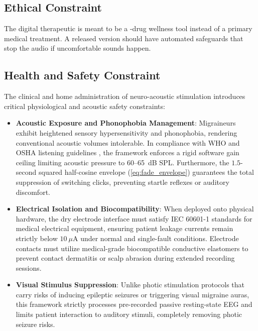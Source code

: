 \documentclass[12pt, a4paper]{report}
\begin{document}
    \subsection{Ethical Constraint}
    The digital therapeutic is meant to be a -drug wellness tool instead of a primary medical treatment. A released version should have automated safeguards that stop the audio if uncomfortable sounds happen.

    \subsection{Health and Safety Constraint}
    The clinical and home administration of neuro-acoustic stimulation introduces critical physiological and acoustic safety constraints:
    \begin{itemize}
        \item \textbf{Acoustic Exposure and Phonophobia Management}: Migraineurs exhibit heightened sensory hypersensitivity and phonophobia, rendering conventional acoustic volumes intolerable. In compliance with WHO and OSHA listening guidelines \cite{He2023}, the framework enforces a rigid software gain ceiling limiting acoustic pressure to 60--65~dB SPL. Furthermore, the $1.5$-second squared half-cosine envelope (\ref{eq:fade_envelope}) guarantees the total suppression of switching clicks, preventing startle reflexes or auditory discomfort.
        \item \textbf{Electrical Isolation and Biocompatibility}: When deployed onto physical hardware, the dry electrode interface must satisfy IEC 60601-1 standards for medical electrical equipment, ensuring patient leakage currents remain strictly below $10~\mu\text{A}$ under normal and single-fault conditions. Electrode contacts must utilize medical-grade biocompatible conductive elastomers to prevent contact dermatitis or scalp abrasion during extended recording sessions.
        \item \textbf{Visual Stimulus Suppression}: Unlike photic stimulation protocols that carry risks of inducing epileptic seizures or triggering visual migraine auras, this framework strictly processes pre-recorded passive resting-state EEG and limits patient interaction to auditory stimuli, completely removing photic seizure risks.
    \end{itemize}
\end{document}
